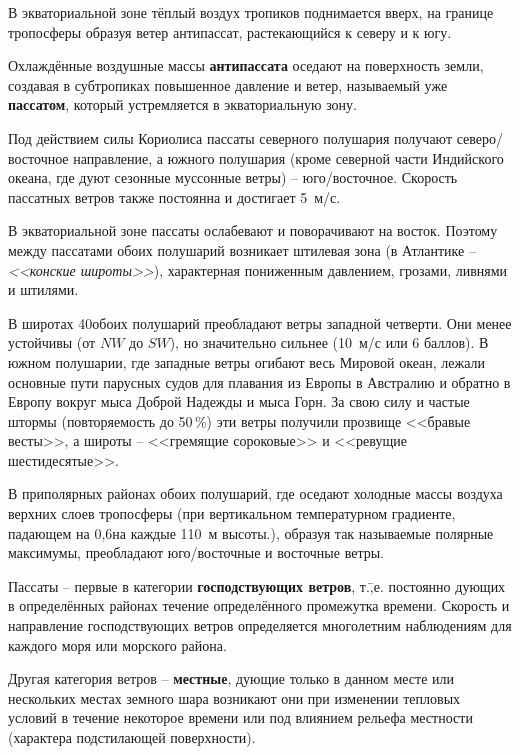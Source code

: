 В экваториальной зоне тёплый воздух тропиков поднимается вверх, на
границе тропосферы образуя ветер антипассат, растекающийся к северу и
к югу.

Охлаждённые воздушные массы
\textbf{антипассата} оседают
на поверхность земли, создавая в субтропиках повышенное давление и
ветер, называемый уже
\textbf{пассатом}, который
устремляется в экваториальную зону.

Под действием силы Кориолиса пассаты северного полушария получают
северо\-/восточное направление, а южного полушария (кроме северной
части Индийского океана, где дуют сезонные муссонные ветры) \---
юго\-/восточное. Скорость пассатных ветров также постоянна и достигает
5~м/с.

В экваториальной зоне пассаты ослабевают и поворачивают на
восток. Поэтому между пассатами обоих полушарий возникает штилевая
зона (в Атлантике \--- \textit{<<конские широты>>}),
характерная пониженным давлением, грозами, ливнями и штилями.

В широтах 40\gr обоих полушарий преобладают ветры западной
четверти. Они менее устойчивы (от $NW$ до $SW$), но значительно
сильнее (10~м/с или 6 баллов). В южном полушарии, где
западные ветры огибают весь Мировой океан, лежали основные пути
парусных судов для плавания из Европы в Австралию и обратно в Европу
вокруг мыса Доброй Надежды и мыса Горн. За свою силу и частые штормы
(повторяемость до 50\,\%) эти ветры получили прозвище <<бравые
весты>>, а широты \---
<<гремящие сороковые>> и
<<ревущие шестидесятые>>.

В приполярных районах обоих полушарий, где оседают холодные массы
воздуха верхних слоев тропосферы (при вертикальном температурном
градиенте, падающем на 0,6\grC на каждые 110~м высоты.), образуя так
называемые полярные максимумы, преобладают юго\-/восточные и восточные
ветры.

Пассаты \--- первые в категории
\textbf{господствующих ветров},
т.\=,е. постоянно дующих в определённых районах течение определённого
промежутка времени. Скорость и направление господствующих ветров
определяется многолетним наблюдениям для каждого моря или морского
района.

Другая категория ветров \--- \textbf{местные},
дующие только в данном месте или нескольких местах земного шара
возникают они при изменении тепловых условий в течение некоторое
времени или под влиянием рельефа местности (характера подстилающей
поверхности).

